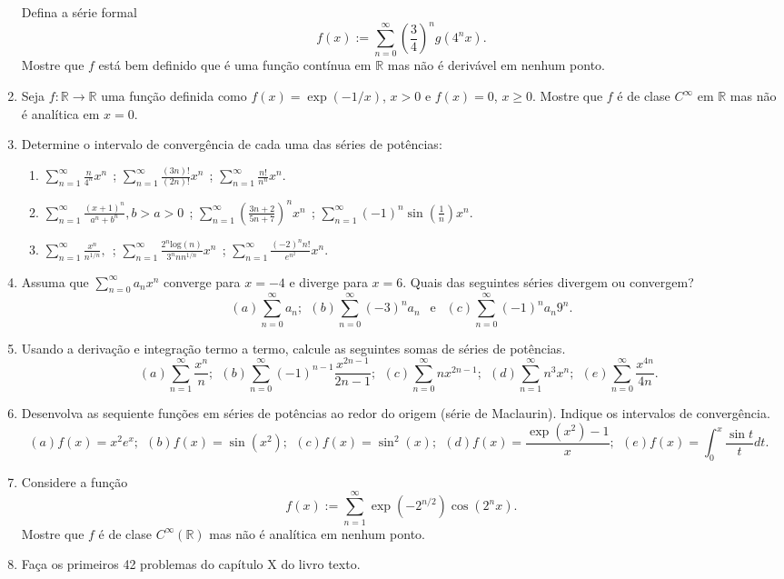 \documentclass{article}
\theoremstyle{plain}
\theoremstyle{definition}
\theoremstyle{remark}
\begin{document}
\begin{enumerate}
  Defina a série formal 
  $$f(x):= \sum_{n=0}^{\infty} (\frac{3}{4})^{n}g(4^{n}x).$$
  Mostre que $f$ está bem definido que é uma função contínua em $\mathbb{R}$
  mas não é derivável em nenhum ponto. 
  \item Seja $f:\mathbb{R}\rightarrow \mathbb{R}$ uma função definida como 
  $f(x)=\exp(-1/x)$, $x>0$ e 
  $f(x)=0$, $x\geq0$. 
  Mostre que $f$ é de clase $C^{\infty}$
  em $\mathbb{R}$ mas não é analítica em $x=0$.
  \item Determine o intervalo de convergência de cada uma das séries de potências:
    \begin{enumerate}
    \item $\sum_{n=1}^{\infty} \frac{n}{4^{n}}x^n \ \ $; 
          $\sum_{n=1}^{\infty} \frac{(3n)!}{(2n)!}x^n  \ \ $; 
          $\sum_{n=1}^{\infty} \frac{n!}{n^{n}}x^n$.
    \item $\sum_{n=1}^{\infty} \frac{(x+1)^n}{a^{n}+b^n}, b>a>0 \ \ $; 
          $\sum_{n=1}^{\infty} (\frac{3n+2}{5n+7})^{n}x^n  \ \ $; 
          $\sum_{n=1}^{\infty} (-1)^{n}\sin(\frac{1}{n})x^n$.   
    \item $\sum_{n=1}^{\infty} \frac{x^n}{n^{1/n}}, \ \ $; 
          $\sum_{n=1}^{\infty}
          \frac{2^n\text{log}(n)}{3^{n}n n^{1/n}}x^n \ \ $; 
          $\sum_{n=1}^{\infty} \frac{(-2)^{n}n!}{e^{n^2}}x^n$.          
    \end{enumerate}
  \item Assuma que $\sum_{n=0}^{\infty} a_n x^n$ converge para 
  $x=-4$ e diverge para $x=6$. 
  Quais das seguintes séries divergem ou convergem?
     $$
       (a) \sum_{n=0}^{\infty} a_n;  \ \ 
       (b) \sum_{n=0}^{\infty} (-3)^n a_n \ \ \text{ e } \ \ 
       (c) \sum_{n=0}^{\infty} (-1)^{n} a_n 9^{n}.  
     $$
  \item Usando a derivação e integração termo a termo, calcule as seguintes somas de séries de potências.
     $$
       (a) \sum_{n=1}^{\infty} \frac{x^n}{n};  \ \ 
       (b) \sum_{n=0}^{\infty} (-1)^{n-1}\frac{x^{2n-1}}{2n-1}; \ \  
       (c) \sum_{n=0}^{\infty} n x^{2n-1}; \ \ 
       (d) \sum_{n=1}^{\infty} n^3 x^n; \ \  
       (e) \sum_{n=0}^{\infty} \frac{x^{4n}}{4n}. \ \  
     $$         
  \item Desenvolva as sequiente 
  funções em séries de potências ao redor do origem (série de Maclaurin). Indique os intervalos de convergência.
    $$
       (a) f(x)=x^2e^x;  \ \ 
       (b) f(x)=\sin(x^2); \ \  
       (c) f(x)=\sin^{2}(x); \ \ 
       (d) f(x)=\frac{\exp(x^2)-1}{x}; \ \  
       (e) f(x)=\int_{0}^{x} \frac{\sin t}{t}dt. \ \  
     $$
  \item Considere a função
  $$ f(x):= \sum_{n=1}^{\infty} \exp(-2^{n/2})\cos(2^{n}x).$$
  Mostre que $f$ é de clase $C^{\infty}(\mathbb{R})$ mas não é analítica em nenhum ponto.  
  \item Faça os primeiros 42 problemas do capítulo X do livro texto.
  \end{enumerate} 
\end{document}
